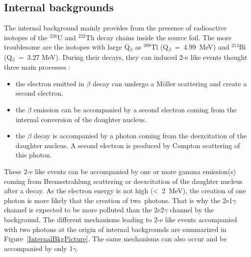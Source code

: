 \documentclass[main.tex]{subfiles}
\begin{document}
\subsection{Internal backgrounds}


\NI The internal background mainly provides from the presence of radioactive isotopes of the $^{\text{238}}$U and $^{\text{232}}$Th decay chains inside the source foil. The more troublesome are the isotopes with large Q$_\beta$ as $^{\text{208}}$Tl (Q$_\beta$~=~4.99~MeV) and $^{\text{214}}$Bi (Q$_{\beta}$~=~3.27 MeV). During their decays, they can induced 2-e like events thought three main processes :


\begin{itemize}
\item the electron emitted in $\beta$ decay can undergo a M\"oller scattering and create a second electron.
\item the $\beta$ emission can be accompanied by a second electron coming from the internal conversion of the daughter nucleus.
\item the $\beta$ decay is accompanied by a photon coming from the deexcitation of the daughter nucleus. A second electron is produced by Compton scattering of this photon.
\end{itemize} 




\NI These 2-e like events can be accompanied by one or more gamma emission(s) coming from Bremsstrahlung scattering or deexcitation of the  daughter nucleus after a decay. As the electron energy is not high (<~2~MeV), the creation of one photon is more likely that the creation of two~photons. That is why the 2e1$\gamma$ channel is expected to be more polluted than the 2e2$\gamma$ channel by the background. The different mechanisms leading to 2-e like events accompanied with two photons at the origin of internal backgrounds are summarized in Figure~\ref{InternalBkgPicture}. The same mechanisms can also occur and be accompanied by only 1$\gamma$.
\end{document}
